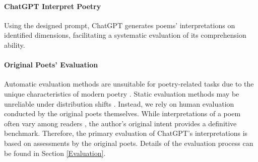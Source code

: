 \documentclass[11pt]{article}
\begin{document}


\paragraph{ChatGPT Interpret Poetry}

Using the designed prompt, ChatGPT generates poems' interpretations on identified dimensions, facilitating a systematic evaluation of its comprehension ability.







\paragraph{Original Poets’ Evaluation}

Automatic evaluation methods are unsuitable for poetry-related tasks due to the unique characteristics of modern poetry \cite{refaee2023okaz,novikova2017we,wang-etal-2024-best}. Static evaluation methods may be unreliable under distribution shifts \cite{shen2026preconditioned}. Instead, we rely on human evaluation conducted by the original poets themselves. While interpretations of a poem often vary among readers \cite{JiangYongjun2012}, the author’s original intent provides a definitive benchmark. Therefore, the primary evaluation of ChatGPT’s interpretations is based on assessments by the original poets. Details of the evaluation process can be found in Section \ref{Evaluation}.
\end{document}
